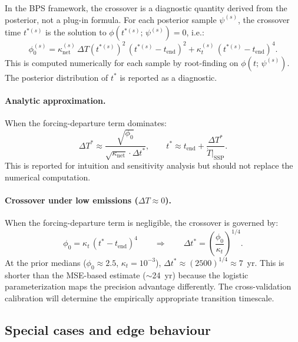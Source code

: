 \documentclass[11pt]{article}
\newcommand{\dT}{\Delta T}
\newcommand{\dTstar}{\Delta T^{*}}
\newcommand{\tend}{t_{\mathrm{end}}}
\begin{document}
In the BPS framework, the crossover is a diagnostic quantity derived from the posterior, not a plug-in formula.  For each posterior sample $\psi^{(s)}$, the crossover time $t^{*(s)}$ is the solution to $\phi(t^{*(s)};\,\psi^{(s)}) = 0$, i.e.:
\begin{equation}
  \phi_0^{(s)} = \kappa_{\mathrm{net}}^{(s)}\,\dT(t^{*(s)})^2\,(t^{*(s)} - \tend)^2 + \kappa_t^{(s)}\,(t^{*(s)} - \tend)^4.
  \label{eq:crossover_numerical}
\end{equation}
This is computed numerically for each sample by root-finding on $\phi(t;\,\psi^{(s)})$.  The posterior distribution of $t^*$ is reported as a diagnostic.

\paragraph{Analytic approximation.}  When the forcing-departure term dominates:
\begin{equation}
  \dTstar \approx \frac{\sqrt{\phi_0}}{\sqrt{\kappa_{\mathrm{net}}} \cdot \Delta t^*}, \qquad t^* \approx \tend + \frac{\dTstar}{\dot{T}\big|_{\mathrm{SSP}}}.
  \label{eq:DT_crossover_analytic}
\end{equation}
This is reported for intuition and sensitivity analysis but should not replace the numerical computation.

\paragraph{Crossover under low emissions ($\dT \approx 0$).}  When the forcing-departure term is negligible, the crossover is governed by:
\begin{equation}
  \phi_0 = \kappa_t\,(t^* - \tend)^4 \qquad\Longrightarrow\qquad \Delta t^* = \left(\frac{\phi_0}{\kappa_t}\right)^{1/4}.
  \label{eq:crossover_lowemissions}
\end{equation}
At the prior medians ($\phi_0 \approx 2.5$, $\kappa_t = 10^{-3}$), $\Delta t^* \approx (2500)^{1/4} \approx 7$~yr.  This is shorter than the MSE-based estimate ($\sim$24~yr) because the logistic parameterization maps the precision advantage differently.  The cross-validation calibration will determine the empirically appropriate transition timescale.


\subsection{Special cases and edge behaviour}
\end{document}
